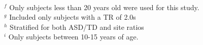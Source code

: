 \documentclass[10pt]{article}
\begin{document}
\begin{landscape}
\begin{table}
{    \\\hspace{\textheight} \(^f\) Only subjects less than 20 years old were used for this study.
    \\\hspace{\textheight} \(^g\) Included only subjects with a TR of 2.0s
    \\\hspace{\textheight} \(^h\) Stratified for both ASD/TD and site ratios
    \\\hspace{\textheight} \(^i\) Only subjects between 10-15 years of age.
  }
  \normalsize
\end{table}
\end{landscape}

\begin{comment}
\section{Key Articles} \label{key-articles}

Note for below I also seem to use the CPAC minimal pipeline, I think.

Of studies that get above e.g. 70.3\% accuracy, there is \emph{almost always} some cheaty feature
selection using all subjects, completely negating the final 10-fold or whatever accuracy values. No
\emph{honest} techniques make it above 70\% accuracy across sites yet \emph{except}
\citet{mostafaDiagnosisAutismSpectrum2019,yinDiagnosisAutismSpectrum2021}, who use eigenvalues of
the graph of the Laplacian of the thresholded correlation matrix.

\subsection{Use of Eigenvalues for Prediction! \citet{mostafaDiagnosisAutismSpectrum2019}} \label{eig-pred}



\subsection{\citet{heinsfeldIdentificationAutismSpectrum2018}}

\begin{itemize}
  \item 70\% with C-PAC preprocessing pipeline
  \item used CC200 atlas to reduce to ROI feature vectors (i.e. not CNN)
  \item actually used functional connectivity as the predictor
  \item used 10-fold validation across all sites (good!)
  \item used a deep denoising autoencoder (really just MLP with some augmentation / dropout on inputs)
\end{itemize}

\end{comment}
\end{document}
